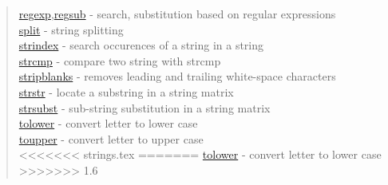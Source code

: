 \begin{quote}
\hyperlink{regexp}{regexp},\hyperlink{regsub}{regsub} - search, substitution based on regular expressions\\
\hyperlink{split}{split} - string splitting\\
\hyperlink{strindex}{strindex} - search occurences of a string in a string\\
\hyperlink{strcmp}{strcmp} - compare two string with strcmp \\
\hyperlink{stripblanks}{stripblanks} - removes leading and trailing white-space characters\\
\hyperlink{strstr}{strstr} - locate a substring in a string matrix\\
\hyperlink{strsubst}{strsubst} - sub-string substitution in a string matrix\\
\hyperlink{tolower}{tolower} - convert letter to lower case\\
\hyperlink{toupper}{toupper} - convert letter to upper case\\
<<<<<<< strings.tex
=======
\hyperlink{tolower}{tolower} - convert letter to lower case\\
>>>>>>> 1.6
\end{quote}





















